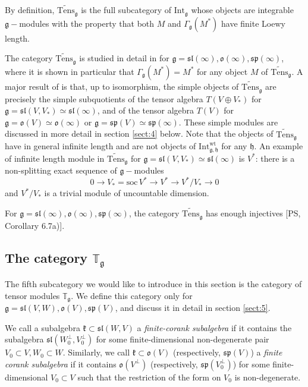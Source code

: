 \documentclass[10pt]{amsart}
\newcommand{\TT}{\mathbb{T}}
\newcommand{\wt}{\mathrm{wt}}
\renewcommand{\sp}{\mathfrak{sp}}
\renewcommand{\sl}{\mathfrak{sl}}
\newcommand{\kk}{\mathfrak{k}}
\newcommand{\oo}{\mathfrak{o}}
\newcommand{\hh}{\mathfrak{h}}
\renewcommand{\gg}{\mathfrak{g}}
\newcommand{\Soc}{\mathrm{soc}}
\begin{document}
By definition, $\widetilde{\mathrm{Tens}}_{\gg}$ is the full subcategory of $\mathrm{Int}_{\gg}$ whose objects are integrable $\gg-$modules with the property that both $M$ and $\Gamma_{\gg}(M^*)$ have finite Loewy length.

The category $\widetilde{\mathrm{Tens}}_{\gg}$ is studied in detail in
\cite{ps} for 
$\gg = \sl(\infty), \oo(\infty), \sp(\infty)$, where it is shown in
particular that 
$\Gamma_{\gg}(M^*) = M^*$ for any object $M$ of
$\widetilde{\mathrm{Tens}}_{\gg}$. A major result of \cite{ps} is
that, up to isomorphism, the simple objects of
$\widetilde{\mathrm{Tens}}_{\gg}$ are precisely the simple
subquotients of the tensor algebra 
$T(V\oplus V_*)$ for $\gg = \sl(V,V_*) \simeq \sl(\infty)$, and of the
tensor algebra 
$T(V)$ for $\gg = \oo(V) \simeq \oo(\infty)$ or $\gg = \sp(V) \simeq\sp(\infty)$. 
These simple modules are discussed in more detail in section
\ref{sect:4} below. Note that the objects of 
$\widetilde{\mathrm{Tens}}_{\gg}$ have in general infinite length and are not objects of $\mathrm{Int}^{\wt}_{\gg,\hh}$ for any $\hh$. 
An example of infinite length module in
$\widetilde{\mathrm{Tens}}_{\gg}$ for $\gg = \sl(V,V_*) \simeq\sl(\infty)$ is 
$V^*$: there is a non-splitting exact sequence of $\gg-$modules 
$$ 0 \to V_* = \Soc\,V^* \rightarrow V^* \rightarrow V^*/V_*\rightarrow 0 $$ and $V^*/V_*$ is a 
trivial module of uncountable dimension.

For $\gg = \sl(\infty), \oo(\infty), \sp(\infty)$, the category
$\widetilde{\mathrm{Tens}}_\gg$ 
has enough injectives [PS, Corollary 6.7a)].


\subsection{The category $\TT_{\gg}$}\label{sect:3.5}
The fifth subcategory we would like to introduce in this section is
the category of tensor modules 
$\TT_{\gg}$. We define this category only for $\gg=\sl(V,W),\oo(V),\sp(V)$, and discuss it in detail in section \ref{sect:5}. 

We call a subalgebra $\kk\subset \sl(W,V)$  a \textit{finite-corank
 subalgebra} if it contains the subalgebra 
$\sl(W_0^\perp,V_0^\perp)$ for some finite-dimensional non-degenerate pair
$V_0\subset V,W_0\subset W$. Similarly, we call $\kk\subset \oo(V)$
(respectively, 
$\sp(V)$) a \textit{finite corank subalgebra}  if it contains $ \oo(V^\perp)$ (respectively, $\sp(V_0^\perp)$) for some finite-dimensional $V_0\subset V$ such that the restriction of the form on $V_0$ is non-degenerate.
\end{document}

